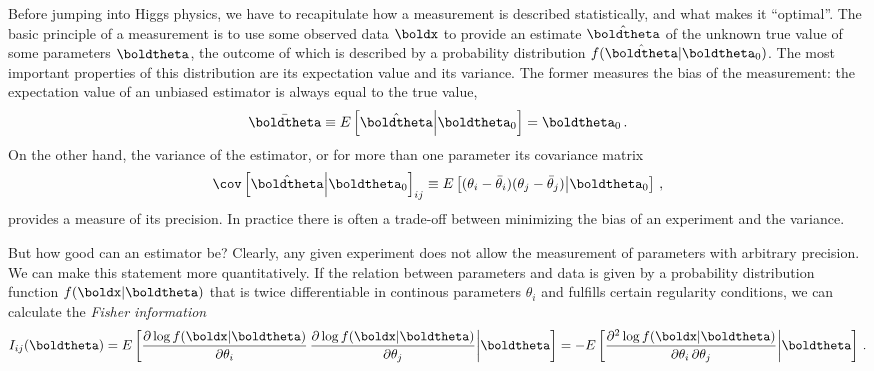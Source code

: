Before jumping into Higgs physics, we have to recapitulate how a
measurement is described statistically, and what makes it
``optimal''. The basic principle of a measurement is to use some
observed data $\boldx$ to provide an estimate $\hat{\boldtheta}$ of
the unknown true value of some parameters $\boldtheta$,
the outcome of which is described by a probability
distribution $f( \hat{\boldtheta} | \boldtheta_0)$. The most
important properties of this distribution are its expectation value
and its variance. The former measures the bias of the measurement: the
expectation value of an unbiased estimator is always equal to the true
value,
%
\begin{equation}
  \bar{\boldtheta} \equiv E \left[ \hat{\boldtheta} \middle | \boldtheta_0 \right] = \boldtheta_0 \,.
\end{equation}
%
On the other hand, the variance of the estimator, or for more than one
parameter its covariance matrix
%
\begin{equation}
  \cov  \left [ \hat{\boldtheta} \middle | \boldtheta_0 \right]_{ij}
  \equiv E \left[ (\theta_i - \bar{\theta}_i )  (\theta_j - \bar{\theta}_j ) \middle | \boldtheta_0 \right] \,,
\end{equation}
%
provides a measure of its precision. In practice there is often a
trade-off between minimizing the bias of an experiment and the
variance.

But how good can an estimator be? Clearly, any given experiment does
not allow the measurement of parameters with arbitrary precision. We
can make this statement more quantitatively. If the relation between
parameters and data is given by a probability distribution function
$f(\boldx | \boldtheta)$ that is twice differentiable in continous
parameters $\theta_i$ and fulfills certain regularity conditions, we
can calculate the \emph{Fisher information}
%
\begin{equation}
  I_{ij} (\boldtheta)
     = E \left[
      \frac {\partial \log f(\boldx |\boldtheta) }  {\partial \theta_i } \,
      \frac {\partial \log f(\boldx |\boldtheta) }  {\partial \theta_j }
      \middle| \boldtheta \right]
      = - E \left[
      \frac {\partial^2 \log f(\boldx |\boldtheta) } {\partial \theta_i \, \partial \theta_j}
      \middle| \boldtheta \right] \,.
    \label{eq:fisher_information}
\end{equation}

